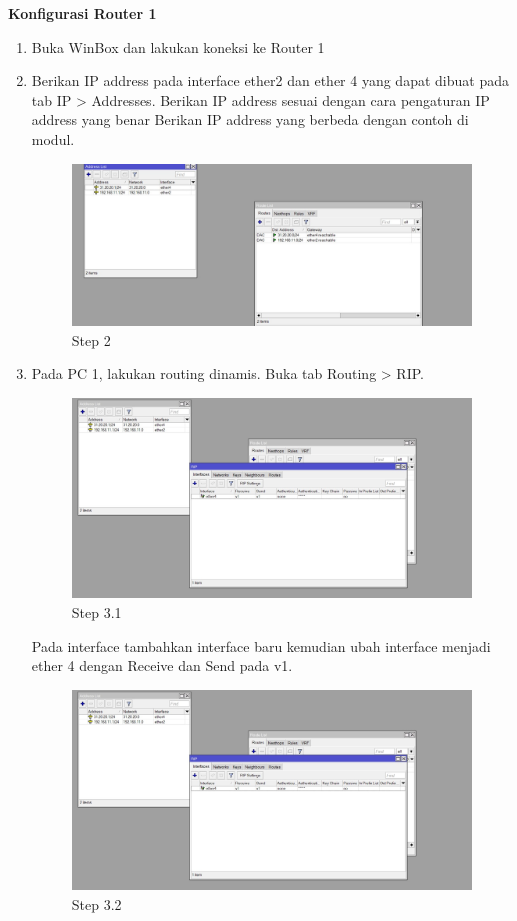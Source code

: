 \begin{center} 
	\textbf{Konfigurasi Router 1}
\end{center}

\begin{enumerate}
	\item Buka WinBox dan lakukan koneksi ke Router 1

	\item Berikan IP address pada interface ether2 dan ether 4 yang dapat dibuat pada tab IP > Addresses. Berikan IP address sesuai dengan cara pengaturan IP address yang benar Berikan IP
	address yang berbeda dengan contoh di modul.
	\begin{figure}[H]
		\centering
		\includegraphics[width=0.5\linewidth]{P2/img/dinamis_R1step2.jpg}
		\caption{Step 2}
		\label{fig:gambar11}
	\end{figure}

	\item Pada PC 1, lakukan routing dinamis. Buka tab Routing > RIP.
	\begin{figure}[H]
		\centering
		\includegraphics[width=0.5\linewidth]{P2/img/dinamis_R1step3.1.jpg}
		\caption{Step 3.1}
		\label{fig:gambar38}
	\end{figure}

	Pada interface tambahkan interface baru kemudian ubah interface menjadi ether 4 dengan Receive dan Send pada v1.
	\begin{figure}[H]
		\centering
		\includegraphics[width=0.5\linewidth]{P2/img/dinamis_R1step3.1.jpg}
		\caption{Step 3.2}
		\label{fig:gambar39}
	\end{figure}


\end{enumerate}

